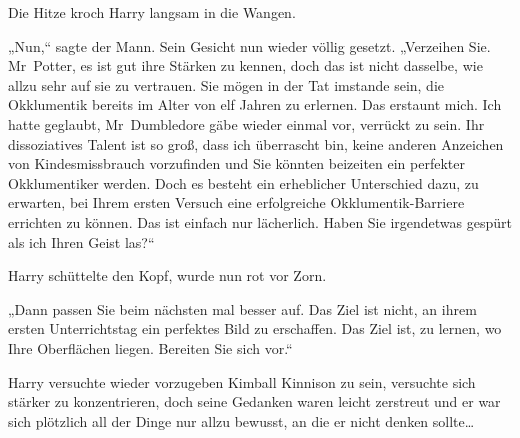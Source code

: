 Die Hitze kroch Harry langsam in die Wangen.

„Nun,“ sagte der Mann. Sein Gesicht nun wieder völlig gesetzt. „Verzeihen Sie. Mr~Potter, es ist gut ihre Stärken zu kennen, doch das ist nicht dasselbe, wie allzu sehr auf sie zu vertrauen. Sie mögen in der Tat imstande sein, die Okklumentik bereits im Alter von elf Jahren zu erlernen. Das erstaunt mich. Ich hatte geglaubt, Mr~Dumbledore gäbe wieder einmal vor, verrückt zu sein. Ihr dissoziatives Talent ist so groß, dass ich überrascht bin, keine anderen Anzeichen von Kindesmissbrauch vorzufinden und Sie könnten beizeiten ein perfekter Okklumentiker werden. Doch es besteht ein erheblicher Unterschied dazu, zu erwarten, bei Ihrem ersten Versuch eine erfolgreiche Okklumentik-Barriere errichten zu können. Das ist einfach nur lächerlich. Haben Sie irgendetwas gespürt als ich Ihren Geist las?“

Harry schüttelte den Kopf, wurde nun rot vor Zorn.

„Dann passen Sie beim nächsten mal besser auf. Das Ziel ist nicht, an ihrem ersten Unterrichtstag ein perfektes Bild zu erschaffen. Das Ziel ist, zu lernen, wo Ihre Oberflächen liegen. Bereiten Sie sich vor.“

Harry versuchte wieder vorzugeben Kimball Kinnison zu sein, versuchte sich stärker zu konzentrieren, doch seine Gedanken waren leicht zerstreut und er war sich plötzlich all der Dinge nur allzu bewusst, an die er nicht denken sollte…

